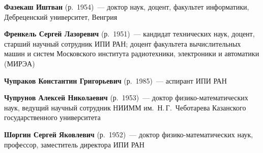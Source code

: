 \begin{multicols}{2}
\noindent
\textbf{Фазекаш Иштван} (р.\ 1954)~--- доктор наук, доцент, факультет информатики, Дебреценский университет, Венгрия

\vspace*{3pt}

\noindent
\textbf{Френкель Сергей Лазоревич} (р.\ 1951)~--- кандидат технических наук, доцент, 
старший научный сотрудник ИПИ РАН; 
доцент факультета вычислительных машин и систем Московского института радиотехники, электроники и автоматики (\mbox{МИРЭА}) 

\vspace*{3pt}

\noindent
\textbf{Чупраков Константин Григорьевич} (р.\ 1985)~--- аспирант ИПИ РАН

\vspace*{3pt}

\thispagestyle{empty}

\noindent
\textbf{Чупрунов Алексей Николаевич} (р.\ 1953)~--- доктор фи\-зи\-ко-математических наук, 
ведущий научный сотрудник НИИММ им.\ Н.\,Г.~Чеботарева Казанского государственного университета


\vspace*{3pt}

\noindent
\textbf{Шоргин Сергей Яковлевич} (р.\ 1952)~--- доктор фи\-зи\-ко-математических наук, 
профессор, заместитель директора ИПИ РАН



\end{multicols}